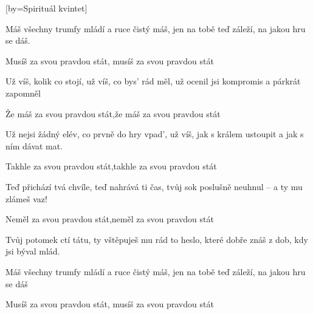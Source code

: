 [by={Spirituál kvintet}]

\beginverse{}
Máš všechny trumfy mládí a ruce čistý máš,
jen na tobě teď záleží, na jakou hru se dáš.
\endverse{}

\beginchorus{}
\lrep{} Musíš za svou pravdou stát, musíš za svou pravdou stát \rrep{}
\endchorus{}

\beginverse{}
Už víš, kolik co stojí, už víš, co bys' rád měl,
už ocenil jsi kompromis a párkrát zapomněl
\endverse{}

\beginchorus{}
\lrep{} Že máš za svou pravdou stát,že máš za svou pravdou stát \rrep{}
\endchorus{}

\beginverse{}
Už nejsi žádný elév, co prvně do hry vpad',
už víš, jak s králem ustoupit a jak s ním dávat mat.
\endverse{}

\beginchorus{}
\lrep{} Takhle za svou pravdou stát,takhle za svou pravdou stát \rrep{}
\endchorus{}

\beginverse{}
Teď přichází tvá chvíle, teď nahrává ti čas,
tvůj sok poslušně neuhnul -- a ty mu zlámeš vaz!
\endverse{}

\beginchorus{}
\lrep{} Neměl za svou pravdou stát,neměl za svou pravdou stát \rrep{}
\endchorus{}

\beginverse{}
Tvůj potomek ctí tátu, ty vštěpuješ mu rád
to heslo, které dobře znáš z dob, kdy jsi býval mlád.
\endverse{}

\beginverse{}
Máš všechny trumfy mládí a ruce čistý máš,
jen na tobě teď záleží, na jakou hru se dáš
\endverse{}

\beginchorus{}
\lrep{} Musíš za svou pravdou stát, musíš za svou pravdou stát \rrep{}
\endchorus{}

\endsong{}
